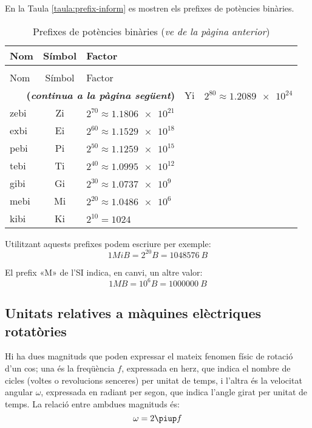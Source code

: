 En la Taula \vref{taula:prefix-inform} es mostren els prefixes de potències binàries.
\begin{longtable}[h]{lcl}
   \caption{\label{taula:prefix-inform} Prefixes de potències binàries}\\
   \toprule[1pt]
    Nom & Símbol  & Factor \\
   \midrule
   \endfirsthead
   \caption[]{Prefixes de potències binàries (\emph{ve de la pàgina anterior})}\\
   \toprule[1pt]
    Nom & Símbol  & Factor \\
   \midrule
   \endhead
   \midrule
   \multicolumn{3}{r}{\sffamily\bfseries\color{NavyBlue}(\emph{continua a la pàgina següent})}
   \endfoot
   \endlastfoot
   yobi & Yi   & $2^{80} \approx \num{1,2089e24}$ \\
   zebi & Zi   & $2^{70} \approx \num{1,1806e21}$ \\
   exbi & Ei   & $2^{60} \approx \num{1,1529e18}$ \\
   pebi & Pi   & $2^{50} \approx \num{1,1259e15}$ \\
   tebi & Ti   & $2^{40} \approx \num{1,0995e12}$ \\
   gibi & Gi   & $2^{30} \approx \num{1,0737e9}$  \\
   mebi & Mi   & $2^{20} \approx \num{1,0486e6}$ \\
   kibi & Ki   & $2^{10} = 1024$  \\
   \bottomrule[1pt]
\end{longtable}
        
   

Utilitzant aquests prefixes podem escriure per exemple:
\[1\unit{MiB} =2^{20}\unit{B} = \SI{1048576}{B}\]

El prefix «M» de l'SI indica, en canvi, un altre valor:
\[1\unit{MB} =10^6\unit{B} = \SI{1000000}{B}\]



\subsection{Unitats relatives a màquines elèctriques rotatòries}

Hi ha dues magnituds que poden expressar el mateix fenomen físic de rotació d'un cos; una és la freqüència $f$, expressada en herz, que indica el nombre de cicles (voltes o revolucions senceres) per unitat de temps, i l'altra és la velocitat angular $\omega$, expressada en radiant per segon, que indica l'angle girat per unitat de temps. La relació entre ambdues magnituds és:
\begin{equation}
  \omega = 2 \piup f
\end{equation}

